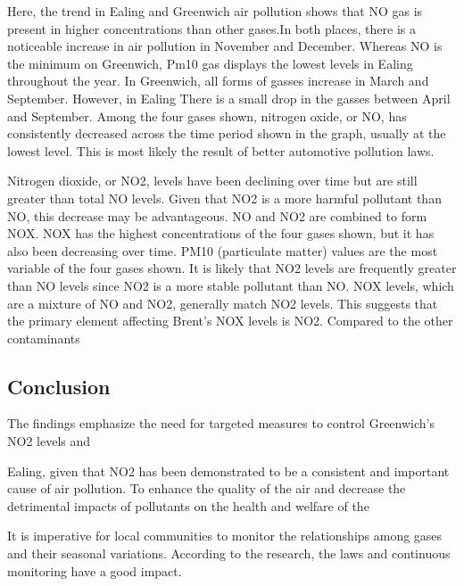 \documentclass{article}
\begin{document}
	Here, the trend in Ealing and Greenwich air pollution shows that NO gas is present in higher concentrations than other gases.In both places, there is a noticeable increase in air pollution in November and December. Whereas NO is the minimum on Greenwich, Pm10 gas displays the lowest levels in Ealing throughout the year. In Greenwich, all forms of gasses increase in March and September. However, in Ealing There is a small drop in the gasses between April and September.
	Among the four gases shown, nitrogen oxide, or NO, has consistently decreased across the time period shown in the graph, usually at the lowest level. This is most likely the result of better automotive pollution laws.
	
	Nitrogen dioxide, or NO2, levels have been declining over time but are still greater than total NO levels. Given that NO2 is a more harmful pollutant than NO, this decrease may be advantageous.
	NO and NO2 are combined to form NOX. NOX has the highest concentrations of the four gases shown, but it has also been decreasing over time. PM10 (particulate matter) values are the most variable of the four gases shown. It is likely that NO2 levels are frequently greater than NO levels since NO2 is a more stable pollutant than NO. NOX levels, which are a mixture of NO and NO2, generally match NO2 levels. This suggests that the primary element affecting Brent's NOX levels is NO2. Compared to the other contaminants
	
	
	
	\begin{center}
		\section{Conclusion}
	\end{center}

	The findings emphasize the need for targeted measures to control Greenwich's NO2 levels and
	
	Ealing, given that NO2 has been demonstrated to be a consistent and important cause of air pollution. To enhance the quality of the air and decrease the detrimental impacts of pollutants on the health and welfare of the
	
	It is imperative for local communities to monitor the relationships among gases and their seasonal variations. According to the research, the laws and continuous monitoring have a good impact.
	
\end{document}

